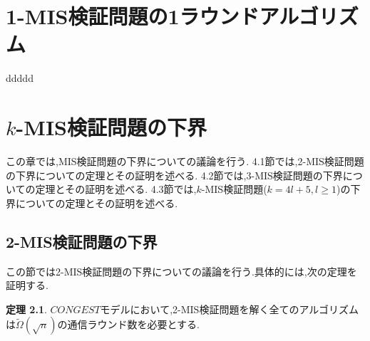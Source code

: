 \documentclass[12pt]{thesis}
\theoremstyle{definition}
\newtheorem{theorem}{定理}[chapter]
\begin{document}
\newpage

\chapter{1-MIS検証問題の1ラウンドアルゴリズム}
ddddd

\chapter{$k$-MIS検証問題の下界}
この章では,MIS検証問題の下界についての議論を行う.
4.1節では,2-MIS検証問題の下界についての定理とその証明を述べる.
4.2節では,3-MIS検証問題の下界についての定理とその証明を述べる.
4.3節では,$k$-MIS検証問題($k = 4l + 5, l \geq 1$)の下界についての定理とその証明を述べる.

\section{2-MIS検証問題の下界}
この節では2-MIS検証問題の下界についての議論を行う.具体的には,次の定理を証明する. 
\begin{theorem}
$CONGEST$モデルにおいて,2-MIS検証問題を解く全てのアルゴリズムは$\tilde{\Omega} (\sqrt{n})$の通信ラウンド数を必要とする.
\end{theorem}
\end{document}
